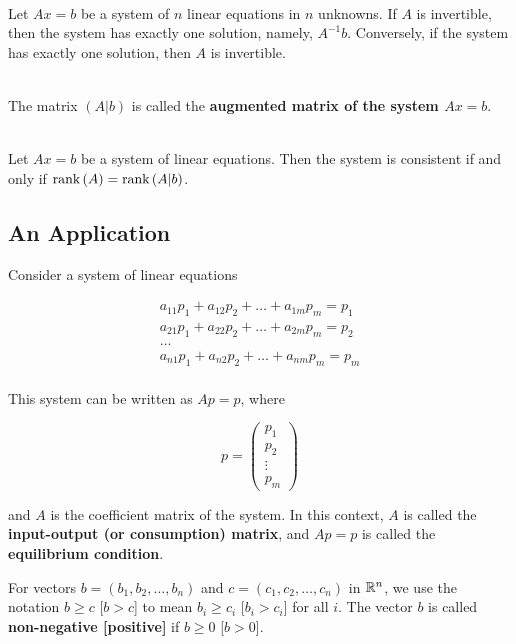\begin{theorem}
	\hfill\\
	Let $Ax = b$ be a system of $n$ linear equations in $n$ unknowns. If $A$ is invertible, then the system has exactly one solution, namely, $A^{-1}b$. Conversely, if the system has exactly one solution, then $A$ is invertible.
\end{theorem}

\begin{definition}
	\hfill\\
	The matrix $(A|b)$ is called the \textbf{augmented matrix of the system $Ax = b$}.
\end{definition}

\begin{theorem}
	\hfill\\
	Let $Ax = b$ be a system of linear equations. Then the system is consistent if and only if $\text{rank}\left(A\right) = \text{rank}\left(A|b\right)$.
\end{theorem}

\subsection*{An Application}

\begin{definition}
	Consider a system of linear equations

	\[\begin{split}
			a_{11}p_1 + a_{12}p_2 + \dots + a_{1m}p_m = p_1 \\
			a_{21}p_1 + a_{22}p_2 + \dots + a_{2m}p_m = p_2 \\
			\dots \\
			a_{n1}p_1 + a_{n2}p_2 + \dots + a_{nm}p_m = p_m \\
		\end{split}\]

	This system can be written as $Ap = p$, where

	\[p = \begin{pmatrix}
			p_1 \\ p_2 \\ \vdots \\ p_m
		\end{pmatrix}\]

	and $A$ is the coefficient matrix of the system. In this context, $A$ is called the \textbf{input-output (or consumption) matrix}, and $Ap = p$ is called the \textbf{equilibrium condition}.

	For vectors $b = (b_1, b_2, \dots, b_n)$ and $c = (c_1, c_2, \dots, c_n)$ in $\mathbb{R}^n$, we use the notation $b \geq c$ [$b > c$] to mean $b_i \geq c_i$ [$b_i > c_i$] for all $i$. The vector $b$ is called \textbf{non-negative [positive]} if $b \geq 0$ [$b > 0$].
\end{definition}

